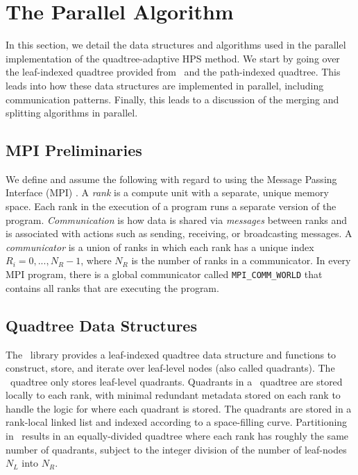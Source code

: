 \section{The Parallel Algorithm}
\label{sec:parallel-algorithm}

In this section, we detail the data structures and algorithms used in the parallel implementation of the quadtree-adaptive HPS method. We start by going over the leaf-indexed quadtree provided from \pforest\ and the path-indexed quadtree. This leads into how these data structures are implemented in parallel, including communication patterns. Finally, this leads to a discussion of the merging and splitting algorithms in parallel.

\subsection{MPI Preliminaries}

We define and assume the following with regard to using the Message Passing Interface (MPI) \citep{mpi40}. A {\em rank} is a compute unit with a separate, unique memory space. Each rank in the execution of a program runs a separate version of the program. {\em Communication} is how data is shared via {\em messages} between ranks and is associated with actions such as sending, receiving, or broadcasting messages. A {\em communicator} is a union of ranks in which each rank has a unique index $R_i = 0, ..., N_{R}-1$, where $N_R$ is the number of ranks in a communicator. In every MPI program, there is a global communicator called {\tt MPI\_COMM\_WORLD} that contains all ranks that are executing the program.

\subsection{Quadtree Data Structures}
\label{sub:quadtree-data-structures}

The \pforest\ library provides a leaf-indexed quadtree data structure and functions to construct, store, and iterate over leaf-level nodes (also called quadrants). The \pforest\ quadtree only stores leaf-level quadrants. Quadrants in a \pforest\ quadtree are stored locally to each rank, with minimal redundant metadata stored on each rank to handle the logic for where each quadrant is stored. The quadrants are stored in a rank-local linked list and indexed according to a space-filling curve. Partitioning in \pforest\ results in an equally-divided quadtree where each rank has roughly the same number of quadrants, subject to the integer division of the number of leaf-nodes $N_{L}$ into $N_{R}$.


